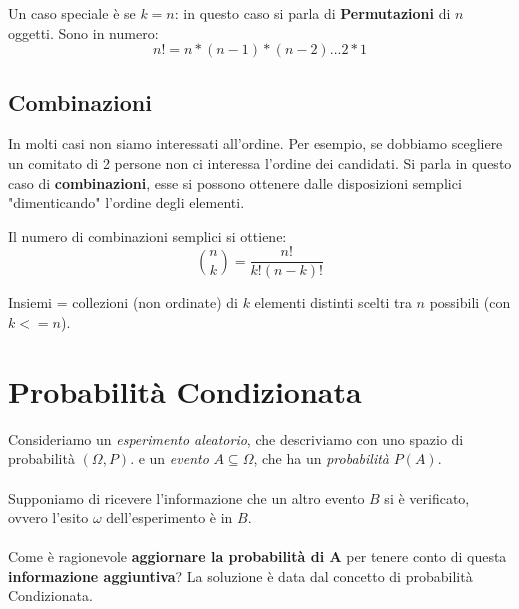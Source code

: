 Un caso speciale è se $k = n$: in questo caso si parla di \textbf{Permutazioni} di $n$ oggetti. 
Sono in numero:
\begin{equation}
    n! = n*(n-1)*(n-2)\dots 2 * 1
\end{equation}


\subsection{Combinazioni}
In molti casi non siamo interessati all'ordine. 
Per esempio, se dobbiamo scegliere un comitato di 2 persone non ci interessa l'ordine 
dei candidati.
Si parla in questo caso di \textbf{combinazioni}, esse si possono ottenere dalle disposizioni semplici
"dimenticando" l'ordine degli elementi.

Il numero di combinazioni semplici si ottiene:
\[
    {n \choose k} = \frac{n!}{k!(n-k)!}
\]

Insiemi = collezioni (non ordinate) di $k$ elementi distinti scelti tra $n$ possibili (con $k <= n$).

\section{Probabilità Condizionata}
Consideriamo un \emph{esperimento aleatorio}, che descriviamo con uno spazio di probabilità $(\Omega, P)$.
e un \emph{evento} $A \subseteq \Omega$, che ha un \emph{probabilità} $P(A)$.
\\\\Supponiamo di ricevere l'informazione che un altro evento $B$ si è verificato, ovvero l'esito $\omega$ dell'esperimento è in $B$.
\\\\Come è ragionevole \textbf{aggiornare la probabilità di A} per tenere conto di questa \textbf{informazione aggiuntiva}?
La soluzione è data dal concetto di probabilità Condizionata.

